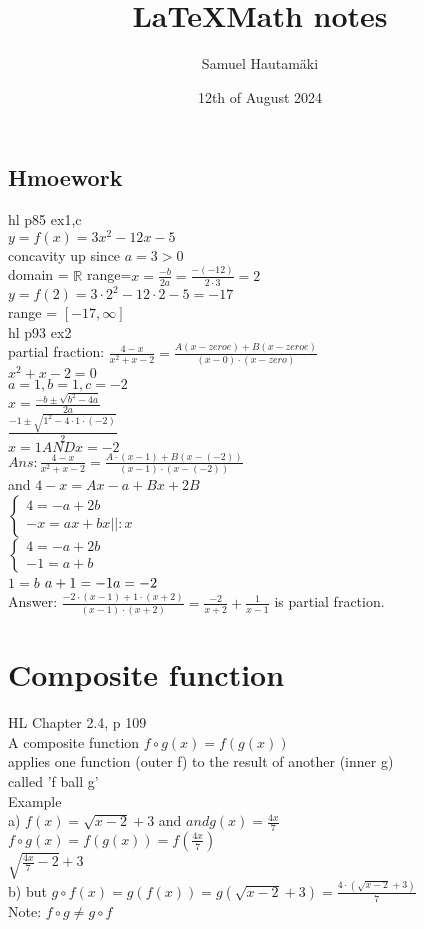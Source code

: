 \documentclass{article}
\title{\LaTeX Math notes}
\author{Samuel Hautamäki}
\date{12th of August 2024}
\begin{document}
  \maketitle
  
  \subsection{Hmoework}
  hl p85 ex1,c\\
  $y=f(x)=3x^2-12x-5$\\
  concavity up since $a=3>0$\\
  domain = $\mathbb{R}$
  range=$x=\frac{-b}{2a}=\frac{-(-12)}{2\cdot3}=2$\\
  $y=f(2)=3\cdot2^2-12\cdot2-5=-17$\\
  range = $[-17,\infty]$\\
  hl p93 ex2\\
  partial fraction: $\frac{4-x}{x^2+x-2}=\frac{A(x-zeroe)+B(x-zeroe)}{(x-0)\cdot(x-zero)}$\\
  $x^2+x-2=0$\\
  $a=1,b=1,c=-2$\\
  $x=\frac{-b\pm\sqrt{b^2-4a}}{2a}$\\
  $\frac{-1\pm\sqrt{1^2-4\cdot1\cdot(-2)}}{2}$\\
  $x=1 AND x=-2$\\
  $Ans: \frac{4-x}{x^2+x-2}=\frac{A\cdot(x-1)+B(x-(-2))}{(x-1)\cdot(x-(-2))}$\\
  and $4-x=Ax-a+Bx+2B$\\
  $\begin{cases}
    4=-a+2b\\-x=ax+bx ||:x
  \end{cases}$\\
  $\begin{cases}
    4=-a+2b\\
    -1=a+b
  \end{cases}$\\
  $1=b$
  $a+1=-1\\a=-2$\\
  Answer: $\frac{-2\cdot(x-1)+1\cdot(x+2)}{(x-1)\cdot(x+2)}=\frac{-2}{x+2}+\frac{1}{x-1}$ is partial fraction.
  

  \section{Composite function}
  HL Chapter 2.4, p 109\\
  A composite function $f\circ g(x)=f(g(x))$\\
  applies one function (outer f) to the result of another (inner g)\\
  called 'f ball g'\\
  Example\\
  a) $f(x)=\sqrt{x-2}+3$ and $and g(x)=\frac{4x}{7}$\\
  $f\circ g(x)=f(g(x))=f(\frac{4x}{7})$\\
  $\sqrt{\frac{4x}{7}-2}+3$\\
  b) but $g\circ f(x)=g(f(x))=g(\sqrt{x-2}+3)=\frac{4\cdot(\sqrt{x-2}+3)}{7}$\\
  Note:  $f\circ g\neq g\circ f$\\
  
\end{document}
